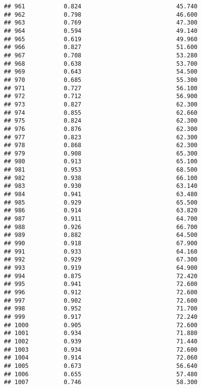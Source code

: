 \documentclass[
]{article}
\begin{document}
\begin{verbatim}
## 961           0.824                           45.740
## 962           0.798                           46.600
## 963           0.769                           47.300
## 964           0.594                           49.140
## 965           0.619                           49.960
## 966           0.827                           51.600
## 967           0.708                           53.280
## 968           0.638                           53.700
## 969           0.643                           54.500
## 970           0.685                           55.300
## 971           0.727                           56.100
## 972           0.712                           56.900
## 973           0.827                           62.300
## 974           0.855                           62.660
## 975           0.824                           62.300
## 976           0.876                           62.300
## 977           0.823                           62.300
## 978           0.868                           62.300
## 979           0.908                           65.300
## 980           0.913                           65.100
## 981           0.953                           68.500
## 982           0.938                           66.100
## 983           0.930                           63.140
## 984           0.941                           63.480
## 985           0.929                           65.500
## 986           0.914                           63.820
## 987           0.911                           64.700
## 988           0.926                           66.700
## 989           0.882                           64.500
## 990           0.918                           67.900
## 991           0.933                           64.160
## 992           0.929                           67.300
## 993           0.919                           64.900
## 994           0.875                           72.420
## 995           0.941                           72.600
## 996           0.912                           72.600
## 997           0.902                           72.600
## 998           0.952                           71.700
## 999           0.917                           72.240
## 1000          0.905                           72.600
## 1001          0.934                           71.880
## 1002          0.939                           71.440
## 1003          0.934                           72.600
## 1004          0.914                           72.060
## 1005          0.673                           56.640
## 1006          0.655                           57.480
## 1007          0.746                           58.300

\end{verbatim}
\end{document}
